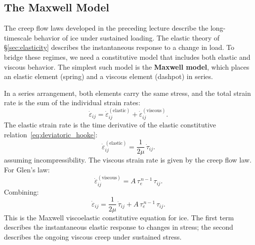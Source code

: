 \documentclass[11pt]{article}
\begin{document}
\subsection{The Maxwell Model}
\label{sec:maxwell_model}

The creep flow laws developed in the preceding lecture describe the long-timescale behavior of ice under sustained loading.  The elastic theory of \S\ref{sec:elasticity} describes the instantaneous response to a change in load.  To bridge these regimes, we need a constitutive model that includes both elastic and viscous behavior.  The simplest such model is the \textbf{Maxwell model}, which places an elastic element (spring) and a viscous element (dashpot) in series.

\begin{center}
\end{center}

\noindent In a series arrangement, both elements carry the same stress, and the total strain rate is the sum of the individual strain rates:
\begin{equation}
  \dot{\varepsilon}_{ij} = \dot{\varepsilon}_{ij}^{(\text{elastic})} + \dot{\varepsilon}_{ij}^{(\text{viscous})}.
  \label{eq:maxwell_decomposition}
\end{equation}
The elastic strain rate is the time derivative of the elastic constitutive relation~\eqref{eq:deviatoric_hooke}:
\begin{equation}
  \dot{\varepsilon}_{ij}^{(\text{elastic})} = \frac{1}{2\mu}\,\dot{\tau}_{ij}.
  \label{eq:elastic_rate}
\end{equation}
assuming incompressibility. The viscous strain rate is given by the creep flow law.  For Glen's law:
\begin{equation}
  \dot{\varepsilon}_{ij}^{(\text{viscous})} = A\,\tau_e^{\,n-1}\,\tau_{ij}.
  \label{eq:viscous_rate}
\end{equation}
Combining:
\begin{equation}
  \boxed{\dot{\varepsilon}_{ij} = \frac{1}{2\mu}\,\dot{\tau}_{ij} + A\,\tau_e^{\,n-1}\,\tau_{ij}.}
  \label{eq:maxwell_constitutive}
\end{equation}
This is the Maxwell viscoelastic constitutive equation for ice.  The first term describes the instantaneous elastic response to changes in stress; the second describes the ongoing viscous creep under sustained stress.
\end{document}
